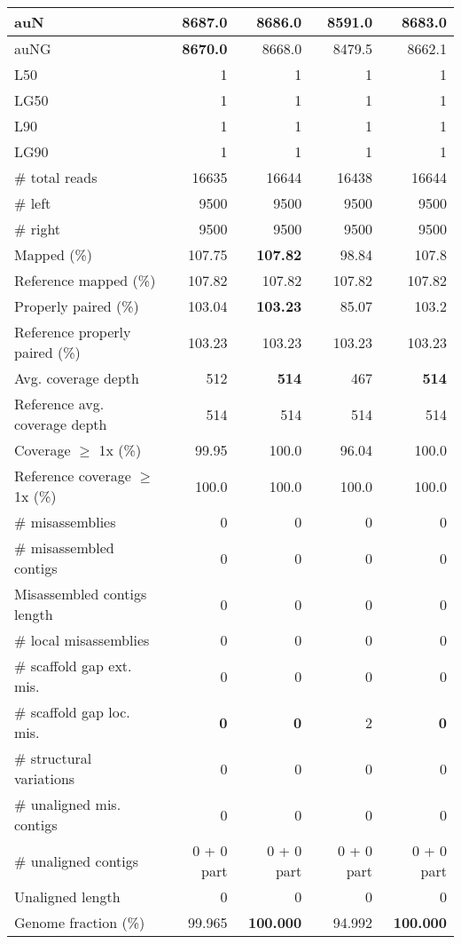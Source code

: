 \documentclass[12pt,a4paper]{article}
\begin{document}
\begin{table}[ht]
\begin{center}
\begin{tabular}{|l*{4}{|r}|}
auN & {\bf 8687.0} & 8686.0 & 8591.0 & 8683.0 \\ \hline
auNG & {\bf 8670.0} & 8668.0 & 8479.5 & 8662.1 \\ \hline
L50 & 1 & 1 & 1 & 1 \\ \hline
LG50 & 1 & 1 & 1 & 1 \\ \hline
L90 & 1 & 1 & 1 & 1 \\ \hline
LG90 & 1 & 1 & 1 & 1 \\ \hline
\# total reads & 16635 & 16644 & 16438 & 16644 \\ \hline
\# left & 9500 & 9500 & 9500 & 9500 \\ \hline
\# right & 9500 & 9500 & 9500 & 9500 \\ \hline
Mapped (\%) & 107.75 & {\bf 107.82} & 98.84 & 107.8 \\ \hline
Reference mapped (\%) & 107.82 & 107.82 & 107.82 & 107.82 \\ \hline
Properly paired (\%) & 103.04 & {\bf 103.23} & 85.07 & 103.2 \\ \hline
Reference properly paired (\%) & 103.23 & 103.23 & 103.23 & 103.23 \\ \hline
Avg. coverage depth & 512 & {\bf 514} & 467 & {\bf 514} \\ \hline
Reference avg. coverage depth & 514 & 514 & 514 & 514 \\ \hline
Coverage $\geq$ 1x (\%) & 99.95 & 100.0 & 96.04 & 100.0 \\ \hline
Reference coverage $\geq$ 1x (\%) & 100.0 & 100.0 & 100.0 & 100.0 \\ \hline
\# misassemblies & 0 & 0 & 0 & 0 \\ \hline
\# misassembled contigs & 0 & 0 & 0 & 0 \\ \hline
Misassembled contigs length & 0 & 0 & 0 & 0 \\ \hline
\# local misassemblies & 0 & 0 & 0 & 0 \\ \hline
\# scaffold gap ext. mis. & 0 & 0 & 0 & 0 \\ \hline
\# scaffold gap loc. mis. & {\bf 0} & {\bf 0} & 2 & {\bf 0} \\ \hline
\# structural variations & 0 & 0 & 0 & 0 \\ \hline
\# unaligned mis. contigs & 0 & 0 & 0 & 0 \\ \hline
\# unaligned contigs & 0 + 0 part & 0 + 0 part & 0 + 0 part & 0 + 0 part \\ \hline
Unaligned length & 0 & 0 & 0 & 0 \\ \hline
Genome fraction (\%) & 99.965 & {\bf 100.000} & 94.992 & {\bf 100.000} \\ \hline

\end{tabular}
\end{center}
\end{table}
\end{document}

